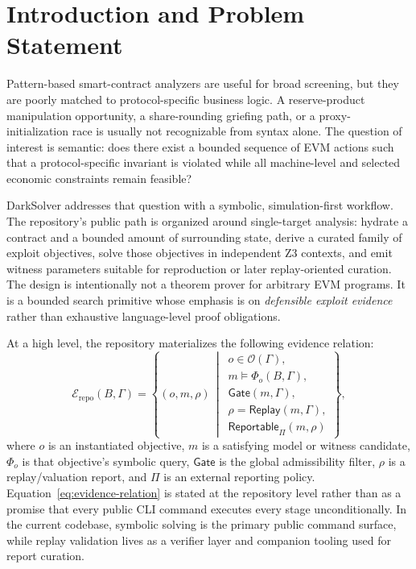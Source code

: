 \documentclass[11pt]{article}
\numberwithin{equation}{section}
\theoremstyle{remark}
\newcommand{\Replay}{\mathsf{Replay}}
\newcommand{\Gate}{\mathsf{Gate}}
\newcommand{\Reportable}{\mathsf{Reportable}}
\newcommand{\Objectives}{\mathcal{O}}
\begin{document}
\section{Introduction and Problem Statement}

Pattern-based smart-contract analyzers are useful for broad screening, but they are poorly matched to protocol-specific business logic. A reserve-product manipulation opportunity, a share-rounding griefing path, or a proxy-initialization race is usually not recognizable from syntax alone. The question of interest is semantic: does there exist a bounded sequence of EVM actions such that a protocol-specific invariant is violated while all machine-level and selected economic constraints remain feasible?

DarkSolver addresses that question with a symbolic, simulation-first workflow. The repository's public path is organized around single-target analysis: hydrate a contract and a bounded amount of surrounding state, derive a curated family of exploit objectives, solve those objectives in independent Z3 contexts, and emit witness parameters suitable for reproduction or later replay-oriented curation. The design is intentionally not a theorem prover for arbitrary EVM programs. It is a bounded search primitive whose emphasis is on \emph{defensible exploit evidence} rather than exhaustive language-level proof obligations.

At a high level, the repository materializes the following evidence relation:
\begin{equation}
\label{eq:evidence-relation}
\mathcal{E}_{\mathrm{repo}}(B,\Gamma)
=
\left\{
(o,m,\rho)
\,\middle|\,
\begin{array}{l}
o \in \Objectives(\Gamma), \\
m \models \Phi_o(B,\Gamma), \\
\Gate(m,\Gamma), \\
\rho = \Replay(m,\Gamma), \\
\Reportable_{\Pi}(m,\rho)
\end{array}
\right\},
\end{equation}
where \(o\) is an instantiated objective, \(m\) is a satisfying model or witness candidate, \(\Phi_o\) is that objective's symbolic query, \(\Gate\) is the global admissibility filter, \(\rho\) is a replay/valuation report, and \(\Pi\) is an external reporting policy. Equation~\eqref{eq:evidence-relation} is stated at the repository level rather than as a promise that every public CLI command executes every stage unconditionally. In the current codebase, symbolic solving is the primary public command surface, while replay validation lives as a verifier layer and companion tooling used for report curation.
\end{document}
